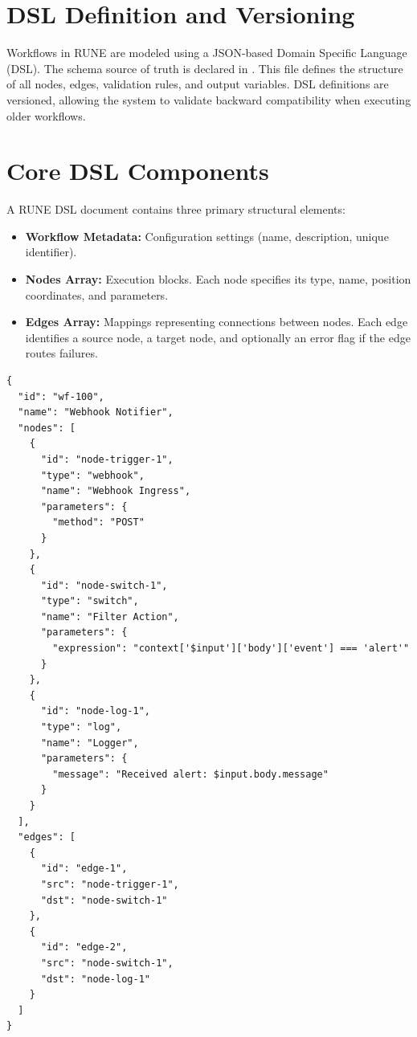 \documentclass[12pt]{report}
\begin{document}
\section{DSL Definition and Versioning}
Workflows in RUNE are modeled using a JSON-based Domain Specific Language (DSL). The schema source of truth is declared in . This file defines the structure of all nodes, edges, validation rules, and output variables. DSL definitions are versioned, allowing the system to validate backward compatibility when executing older workflows.

\section{Core DSL Components}
A RUNE DSL document contains three primary structural elements:
\begin{itemize}
    \item \textbf{Workflow Metadata:} Configuration settings (name, description, unique identifier).
    \item \textbf{Nodes Array:} Execution blocks. Each node specifies its type, name, position coordinates, and parameters.
    \item \textbf{Edges Array:} Mappings representing connections between nodes. Each edge identifies a source node, a target node, and optionally an error flag if the edge routes failures.
\end{itemize}

\begin{lstlisting}[language={}, caption=Workflow DSL JSON Example]
{
  "id": "wf-100",
  "name": "Webhook Notifier",
  "nodes": [
    {
      "id": "node-trigger-1",
      "type": "webhook",
      "name": "Webhook Ingress",
      "parameters": {
        "method": "POST"
      }
    },
    {
      "id": "node-switch-1",
      "type": "switch",
      "name": "Filter Action",
      "parameters": {
        "expression": "context['$input']['body']['event'] === 'alert'"
      }
    },
    {
      "id": "node-log-1",
      "type": "log",
      "name": "Logger",
      "parameters": {
        "message": "Received alert: $input.body.message"
      }
    }
  ],
  "edges": [
    {
      "id": "edge-1",
      "src": "node-trigger-1",
      "dst": "node-switch-1"
    },
    {
      "id": "edge-2",
      "src": "node-switch-1",
      "dst": "node-log-1"
    }
  ]
}
\end{lstlisting}
\end{document}
